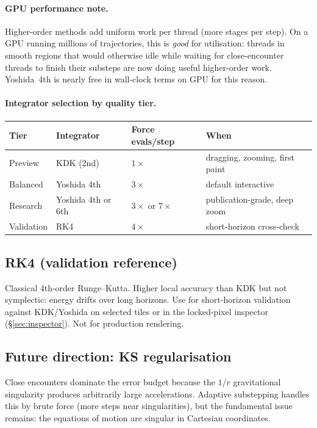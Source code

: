 \documentclass[11pt]{report}
\begin{document}
\paragraph{GPU performance note.} Higher-order methods add uniform work per thread (more stages per step). On a GPU running millions of trajectories, this is \emph{good} for utilisation: threads in smooth regions that would otherwise idle while waiting for close-encounter threads to finish their substeps are now doing useful higher-order work. Yoshida~4th is nearly free in wall-clock terms on GPU for this reason.

\paragraph{Integrator selection by quality tier.}
\begin{center}
\begin{tabular}{llll}
\toprule
Tier & Integrator & Force evals/step & When \\
\midrule
Preview & KDK (2nd) & $1\times$ & dragging, zooming, first paint \\
Balanced & Yoshida 4th & $3\times$ & default interactive \\
Research & Yoshida 4th or 6th & $3\times$ or $7\times$ & publication-grade, deep zoom \\
Validation & RK4 & $4\times$ & short-horizon cross-check \\
\bottomrule
\end{tabular}
\end{center}

\subsection{RK4 (validation reference)}

Classical 4th-order Runge--Kutta. Higher local accuracy than KDK but not symplectic: energy drifts over long horizons. Use for short-horizon validation against KDK/Yoshida on selected tiles or in the locked-pixel inspector (\S\ref{sec:inspector}). Not for production rendering.

\subsection{Future direction: KS regularisation}

Close encounters dominate the error budget because the $1/r$ gravitational singularity produces arbitrarily large accelerations. Adaptive substepping handles this by brute force (more steps near singularities), but the fundamental issue remains: the equations of motion are singular in Cartesian coordinates.
\end{document}
